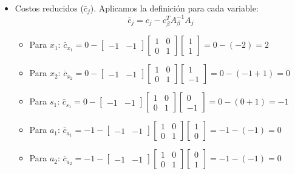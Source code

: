 \begin{itemize}
  \item Costos reducidos (\(\bar{c}_j\)). Aplicamos la definición para cada variable:
   \[
   \bar{c}_j = c_j - c_\beta^T A_\beta^{-1} A_j
   \]
   \begin{itemize}
    \item Para \(x_1\):
     \(
     \bar{c}_{x_1} = 0 - \begin{bmatrix} -1 & -1 \end{bmatrix} \begin{bmatrix} 1 & 0\\ 0 & 1 \end{bmatrix} \begin{bmatrix} 1 \\ 1 \end{bmatrix} = 0 - (-2) = 2
     \)
    \item Para \(x_2\):
     \(
     \bar{c}_{x_2} = 0 - \begin{bmatrix} -1 & -1 \end{bmatrix} \begin{bmatrix} 1 & 0\\ 0 & 1 \end{bmatrix} \begin{bmatrix} 1 \\ -1 \end{bmatrix} = 0 - ( -1 + 1 ) = 0
     \)
    \item Para \(s_1\):
     \(
     \bar{c}_{s_1} = 0 - \begin{bmatrix} -1 & -1 \end{bmatrix} \begin{bmatrix} 1 & 0\\ 0 & 1 \end{bmatrix} \begin{bmatrix} 0 \\ -1 \end{bmatrix} = 0 - ( 0 + 1 ) = -1
     \)
    \item Para \(a_1\):
     \(
     \bar{c}_{a_1} = -1 - \begin{bmatrix} -1 & -1 \end{bmatrix} \begin{bmatrix} 1 & 0\\ 0 & 1 \end{bmatrix} \begin{bmatrix} 1 \\ 0 \end{bmatrix} = -1 - (-1) = 0
     \)
    \item Para \(a_2\):
     \(
     \bar{c}_{a_2} = -1 - \begin{bmatrix} -1 & -1 \end{bmatrix} \begin{bmatrix} 1 & 0\\ 0 & 1 \end{bmatrix} \begin{bmatrix} 0 \\ 1 \end{bmatrix} = -1 - (-1) = 0
     \)
   \end{itemize}
\end{itemize}

